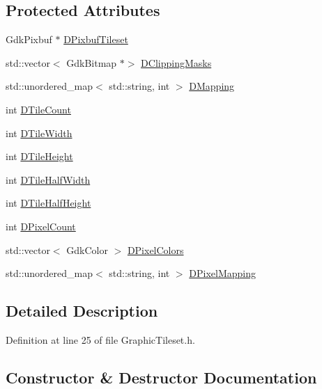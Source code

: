 \subsection*{Protected Attributes}
\begin{DoxyCompactItemize}
\item 
Gdk\+Pixbuf $\ast$ \hyperlink{classCGraphicTileset_a5d5adfcdbb347a6df3f57535ca08e3ef}{D\+Pixbuf\+Tileset}
\item 
std\+::vector$<$ Gdk\+Bitmap $\ast$$>$ \hyperlink{classCGraphicTileset_a3761aec1b9a8bf189da5a7202d7fcac9}{D\+Clipping\+Masks}
\item 
std\+::unordered\+\_\+map$<$ std\+::string, int $>$ \hyperlink{classCGraphicTileset_a17cd13f68f77ea4976b59b37b10e914b}{D\+Mapping}
\item 
int \hyperlink{classCGraphicTileset_a39d942b370e47f441bf97385eb1037c8}{D\+Tile\+Count}
\item 
int \hyperlink{classCGraphicTileset_a2d0c7d19865b81911a3a43d5cae50e00}{D\+Tile\+Width}
\item 
int \hyperlink{classCGraphicTileset_af48f32e07d5fe69afd5f764318cc3244}{D\+Tile\+Height}
\item 
int \hyperlink{classCGraphicTileset_a3e82808009078ce29f6b74bcd077b251}{D\+Tile\+Half\+Width}
\item 
int \hyperlink{classCGraphicTileset_a16c8bc4e4c8738fe561b0408cd40ccef}{D\+Tile\+Half\+Height}
\item 
int \hyperlink{classCGraphicTileset_a55fc9ceb1c92383c124e61c911fe57db}{D\+Pixel\+Count}
\item 
std\+::vector$<$ Gdk\+Color $>$ \hyperlink{classCGraphicTileset_a4e9672b8b133dbac600fb8bb400d1cb3}{D\+Pixel\+Colors}
\item 
std\+::unordered\+\_\+map$<$ std\+::string, int $>$ \hyperlink{classCGraphicTileset_a650c021d8ea1724a4c9564600df0da05}{D\+Pixel\+Mapping}
\end{DoxyCompactItemize}


\subsection{Detailed Description}


Definition at line 25 of file Graphic\+Tileset.\+h.



\subsection{Constructor \& Destructor Documentation}
\hypertarget{classCGraphicTileset_a871889683273be71a94c73776fcd507b}{}\label{classCGraphicTileset_a871889683273be71a94c73776fcd507b} 
